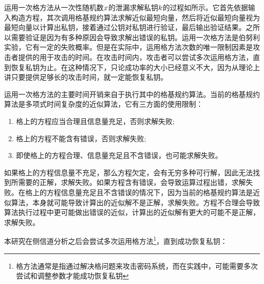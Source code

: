 {\begin{figure}[!htb]
		\label{fig:solver}	
	\end{figure}
	
	运用一次格方法从一次性随机数$x$的泄漏求解私钥$k$的过程如所示。它首先依据输入构造方程，其次调用格基规约算法求解近似最短向量，然后将近似最短向量视为最短向量以计算出私钥，接着通过公钥对私钥进行验证，最后输出验证结果。之所以需要验证是因为有多种原因会导致求解出错误的私钥。运用一次格方法是伯努利实验，它有一定的失败概率。但是在实际中，运用格方法次数的唯一限制因素是攻击者提供的用于攻击的时间。在攻击时间内，攻击者可以尝试多次运用格方法，直到恢复私钥为止。在这种情况下，只论成功率的大小已经意义不大，因为从理论上讲只要提供足够长的攻击时间，就一定能恢复私钥。%
	
	运用一次格方法的主要时间开销来自于执行其中的格基规约算法。当前的格基规约算法是多项式时间复杂度的近似算法，它有三方面的使用限制：
	
	\begin{enumerate}
		\item 格上的方程应当合理且信息量充足，否则求解失败;
		\item 格上的方程不能含有错误，否则求解失败;
		\item 即使格上的方程合理、信息量充足且不含错误，也可能求解失败。
	\end{enumerate}
	
	如果格上的方程信息量不充足，那么方程欠定，会有无穷多种可行解，因此无法找到所需要的正解，求解失败。如果方程含有错误，会导致运算过程出错，求解失败。在格上的方程信息量充足且不含错误的情况下，因为当前的格基规约算法是近似算法，本身就可能导致计算出的近似解不是正解，求解失败。方程不合理会导致算法执行过程中更可能做出错误的近似，计算出的近似解有更大的可能不是正解，求解失败。
	
	本研究在侧信道分析之后会尝试多次运用格方法\footnote{格方法通常是指通过解决格问题来攻击密码系统，而在实践中，可能需要多次尝试和调整参数才能成功恢复私钥}，直到成功恢复私钥：
	
}
